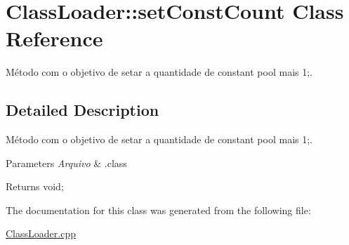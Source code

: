 \hypertarget{class_class_loader_1_1set_const_count}{}\section{Class\+Loader\+:\+:set\+Const\+Count Class Reference}
\label{class_class_loader_1_1set_const_count}


Método com o objetivo de setar a quantidade de constant pool mais 1;.  




\subsection{Detailed Description}
Método com o objetivo de setar a quantidade de constant pool mais 1;. 


\begin{DoxyParams}{Parameters}
{\em Arquivo} & .class \\
\hline
\end{DoxyParams}
\begin{DoxyReturn}{Returns}
void; 
\end{DoxyReturn}


The documentation for this class was generated from the following file\+:\begin{DoxyCompactItemize}
\item 
\hyperlink{_class_loader_8cpp}{Class\+Loader.\+cpp}\end{DoxyCompactItemize}
